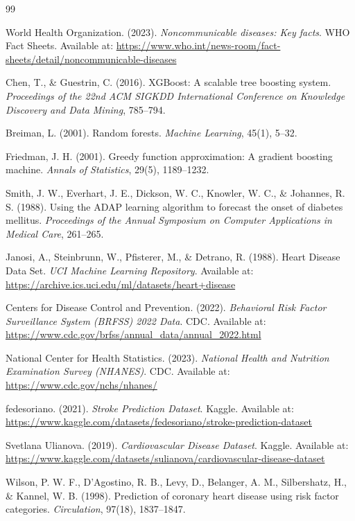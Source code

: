 \documentclass[12pt,a4paper]{report}
\begin{document}
\begin{thebibliography}{99}

World Health Organization. (2023). \textit{Noncommunicable diseases: Key facts}. WHO Fact Sheets. Available at: \url{https://www.who.int/news-room/fact-sheets/detail/noncommunicable-diseases}

Chen, T., \& Guestrin, C. (2016). XGBoost: A scalable tree boosting system. \textit{Proceedings of the 22nd ACM SIGKDD International Conference on Knowledge Discovery and Data Mining}, 785--794.

Breiman, L. (2001). Random forests. \textit{Machine Learning}, 45(1), 5--32.

Friedman, J. H. (2001). Greedy function approximation: A gradient boosting machine. \textit{Annals of Statistics}, 29(5), 1189--1232.

Smith, J. W., Everhart, J. E., Dickson, W. C., Knowler, W. C., \& Johannes, R. S. (1988). Using the ADAP learning algorithm to forecast the onset of diabetes mellitus. \textit{Proceedings of the Annual Symposium on Computer Applications in Medical Care}, 261--265.

Janosi, A., Steinbrunn, W., Pfisterer, M., \& Detrano, R. (1988). Heart Disease Data Set. \textit{UCI Machine Learning Repository}. Available at: \url{https://archive.ics.uci.edu/ml/datasets/heart+disease}

Centers for Disease Control and Prevention. (2022). \textit{Behavioral Risk Factor Surveillance System (BRFSS) 2022 Data}. CDC. Available at: \url{https://www.cdc.gov/brfss/annual_data/annual_2022.html}

National Center for Health Statistics. (2023). \textit{National Health and Nutrition Examination Survey (NHANES)}. CDC. Available at: \url{https://www.cdc.gov/nchs/nhanes/}

fedesoriano. (2021). \textit{Stroke Prediction Dataset}. Kaggle. Available at: \url{https://www.kaggle.com/datasets/fedesoriano/stroke-prediction-dataset}

Svetlana Ulianova. (2019). \textit{Cardiovascular Disease Dataset}. Kaggle. Available at: \url{https://www.kaggle.com/datasets/sulianova/cardiovascular-disease-dataset}

Wilson, P. W. F., D'Agostino, R. B., Levy, D., Belanger, A. M., Silbershatz, H., \& Kannel, W. B. (1998). Prediction of coronary heart disease using risk factor categories. \textit{Circulation}, 97(18), 1837--1847.


\end{thebibliography}
\end{document}
